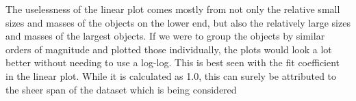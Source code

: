 \documentclass[12pt]{article}
\begin{document}
The uselessness of the linear plot comes mostly from not only the relative small sizes and masses of the objects on the lower end, but also the relatively large sizes and masses of the largest objects. If we were to group the objects by similar orders of magnitude and plotted those individually, the plots would look a lot better without needing to use a log-log. This is best seen with the fit coefficient in the linear plot. While it is calculated as 1.0, this can surely be attributed to the sheer span of the dataset which is being considered
\end{document}

